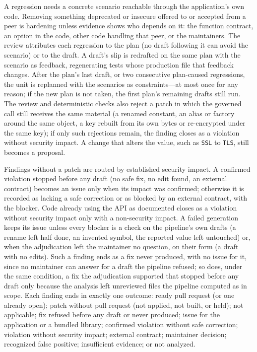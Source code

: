 \documentclass[conference]{IEEEtran}
\begin{document}
A regression needs a concrete scenario reachable through the application's own
code. Removing something deprecated or insecure offered to or accepted from a
peer is hardening unless evidence shows who depends on it: the function
contract, an option in the code, other code handling that peer, or the
maintainers. The review attributes each regression to the plan (no draft
following it can avoid the scenario) or to the draft. A draft's slip is
redrafted on the same plan with the scenario as feedback, regenerating tests
whose production file that feedback changes. After the plan's last draft, or
two consecutive plan-caused regressions, the unit is replanned with the
scenarios as constraints---at most once for any reason; if the new plan is not
taken, the first plan's remaining drafts still run. The review and
deterministic checks also reject a patch in which the governed call still
receives the same material (a renamed constant, an
alias or factory around the same object, a key rebuilt from its own bytes or
re-encrypted under the same key); if only such rejections remain, the finding
closes as a violation without security impact. A change that alters the value,
such as \texttt{SSL} to \texttt{TLS}, still becomes a proposal.

Findings without a patch are routed by established security impact. A
confirmed violation stopped before any draft (no safe fix, no edit found, an
external contract) becomes an issue only when its impact was confirmed;
otherwise it is recorded as lacking a safe correction or as blocked by an
external contract, with the blocker. Code already using the API as documented
closes as a violation without security impact only with a non-security impact.
A failed generation keeps its issue unless every blocker is a check on the
pipeline's own drafts (a rename left half done, an invented symbol, the
reported value left untouched) or, when the adjudication left the maintainer no
question, on their form (a draft with no edits). Such a finding ends as a fix
never produced, with no issue for it, since no maintainer can answer for a
draft the pipeline refused; so does, under the same condition, a fix the
adjudication supported that stopped before any draft only because the analysis
left unreviewed files the pipeline computed as in scope. Each finding ends in
exactly one outcome:
ready pull request (or one already open); patch without pull request (not
applied, not built, or held); not applicable; fix refused before any draft or
never produced; issue for the application or a bundled library; confirmed
violation without safe correction; violation without security impact; external
contract; maintainer decision; recognized false positive; insufficient
evidence; or not analyzed.
\end{document}
